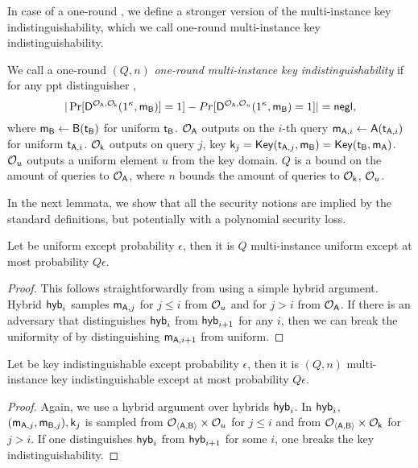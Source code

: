 In case of a one-round \UKA, we define a stronger version of the multi-instance key indistinguishability, which we call one-round multi-instance key indistinguishability.

\begin{definition}
We call a one-round \UKA $(Q,n)$ \emph{one-round multi-instance key indistinguishability} if for any ppt distinguisher \D,
$$
|\Pr[\mathsf D^{\mathcal{O}_{\mathsf{A}}, \mathcal{O}_{\mathsf{k}}}(1^{\kappa},\mathsf{m}_\mathsf{B})]=1]-Pr[\mathsf D^{\mathcal{O}_{\mathsf{A}},\mathcal{O}_{u}}(1^{\kappa},\mathsf{m}_\mathsf{B})=1]|=\mathsf{negl},
$$
where $\mathsf{m}_{\mathsf{B}}\leftarrow\mathsf{B}(\mathsf{t}_{\mathsf{B}})$ for uniform $\mathsf{t}_{\mathsf{B}}$. $\mathcal{O}_{\mathsf{A}}$ outputs on the $i$-th query $\mathsf{m}_{\mathsf{A},i}\leftarrow \mathsf{A}(\mathsf{t}_{\mathsf{A},i})$ for uniform $\mathsf{t}_{\mathsf{A},i}$. $\mathcal{O}_{\mathsf{k}}$ outputs on query $j$, key $\mathsf{k}_j=\mathsf{Key}(\mathsf{t}_{\mathsf{A},j},\mathsf{m}_{\mathsf{B}})=\mathsf{Key}(\mathsf{t}_{\mathsf{B}},\mathsf{m}_{\mathsf{A}})$. $\mathcal{O}_u$ outputs a uniform element $u$ from the key domain. $Q$ is a bound on the amount of queries to $\mathcal{O}_{\mathsf{A}}$, where $n$ bounds the amount of queries to $\mathcal{O}_{\mathsf{k}}$, $\mathcal{O}_{u}$. 
\end{definition}

In the next lemmata, we show that all the security notions are implied by the standard definitions, but potentially with a polynomial security loss.
 
\begin{lemma}\label{lem:multuniform}
Let \UKA be uniform except probability $\epsilon$, then it is $Q$ multi-instance uniform except at most probability $Q\epsilon$.
\end{lemma}
\begin{proof}
This follows straightforwardly from using a simple hybrid argument. Hybrid $\mathsf{hyb}_{i}$ samples $\mathsf{m}_{\mathsf{A},j}$ for $j\leq i$ from $\mathcal{O}_u$ and for $j>i$ from $\mathcal{O}_{\mathsf{A}}$. If there is an adversary that distinguishes $\mathsf{hyb}_i$ from $\mathsf{hyb}_{i+1}$ for any $i$, then we can break the uniformity of \UKA by distinguishing $\mathsf{m}_{\mathsf{A},i+1}$ from uniform.  
\pe
\end{proof}

\begin{lemma}\label{lem:keytomultkey}
Let \UKA be key indistinguishable except probability $\epsilon$, then it is $(Q,n)$ multi-instance key indistinguishable except at most probability $Q\epsilon$. 
\end{lemma}

\begin{proof}
Again, we use a hybrid argument over hybrids $\mathsf{hyb}_i$. In $\mathsf{hyb}_i$, $(\mathsf{m}_{\mathsf{A},j},\mathsf{m}_{\mathsf{B},j}),\mathsf{k}_j$ is sampled from $\mathcal{O}_{\langle \mathsf{A},\mathsf{B}\rangle}\times\mathcal{O}_u$ for $j\leq i$ and from $\mathcal{O}_{\langle \mathsf{A},\mathsf{B}\rangle}\times\mathcal{O}_\mathsf{k}$ for $j>i$. If one distinguishes $\mathsf{hyb}_i$ from $\mathsf{hyb}_{i+1}$ for some $i$, one breaks the key indistinguishability. 
\pe
\end{proof}

